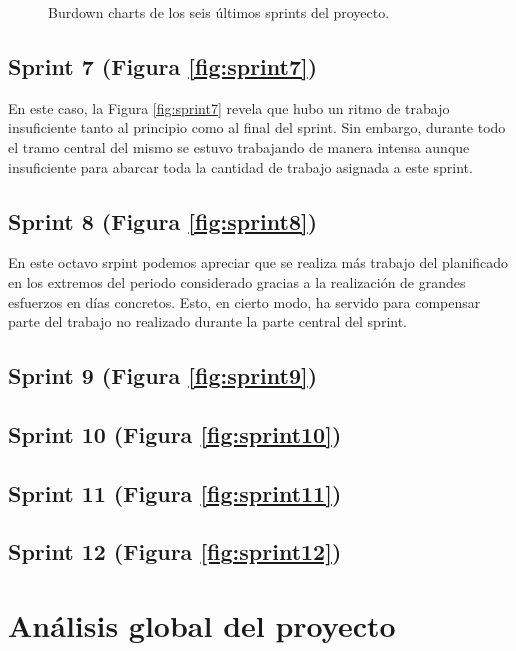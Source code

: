 \begin{figure}[H]
\centering
{}\qquad
{}\qquad
{}\qquad
{}\qquad
{}\qquad
{}
\caption{Burdown charts de los seis últimos sprints del proyecto.}
\label{fig:sprints7-12}
\end{figure}

\subsection{Sprint 7 (Figura \ref{fig:sprint7})}

En este caso, la Figura \ref{fig:sprint7} revela que hubo un ritmo de trabajo insuficiente tanto al principio como al final del sprint. Sin embargo, durante todo el tramo central del mismo se estuvo trabajando de manera intensa aunque insuficiente para abarcar toda la cantidad de trabajo asignada a este sprint.

\subsection{Sprint 8 (Figura \ref{fig:sprint8})}

En este octavo srpint podemos apreciar que se realiza más trabajo del planificado en los extremos del periodo considerado gracias a la realización de grandes esfuerzos en días concretos. Esto, en cierto modo, ha servido para compensar parte del trabajo no realizado durante la parte central del sprint.

\subsection{Sprint 9 (Figura \ref{fig:sprint9})}
\subsection{Sprint 10 (Figura \ref{fig:sprint10})}
\subsection{Sprint 11 (Figura \ref{fig:sprint11})}
\subsection{Sprint 12 (Figura \ref{fig:sprint12})}

\section{Análisis global del proyecto}
